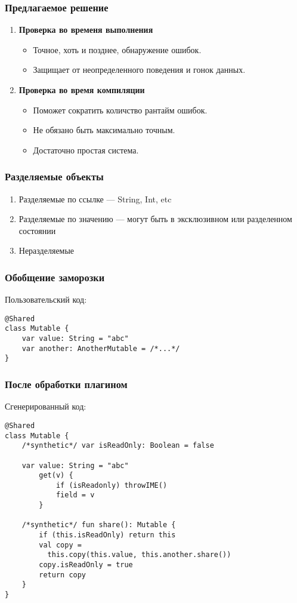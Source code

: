 \documentclass[14pt,xcolor={dvipsnames}]{beamer}
\begin{document}
\begin{frame}
\frametitle{Предлагаемое решение}
\begin{enumerate}
  \item \textbf{Проверка во временя выполнения}
  \begin{itemize}
    \item Точное, хоть и позднее, обнаружение ошибок.
    \item Защищает от неопределенного поведения и гонок данных.
  \end{itemize}
  \item \textbf{Проверка во время компиляции}
  \begin{itemize}
    \item Поможет сократить количство рантайм ошибок.
    \item Не обязано быть максимально точным.
    \item Достаточно простая система.
  \end{itemize}
\end{enumerate}
\end{frame}

\begin{frame}
\frametitle{Разделяемые объекты}
\begin{enumerate}
	\item Разделяемые по ссылке --- String, Int, etc
	\item Разделяемые по значению --- могут быть в эксклюзивном или разделенном состоянии
	\item Неразделяемые
\end{enumerate}
\end{frame}

\begin{frame}[fragile]
\frametitle{Обобщение заморозки}
Пользовательский код:
\vspace{20pt}
\begin{lstlisting}[basicstyle=\small\ttfamily]
@Shared
class Mutable {
	var value: String = "abc"
	var another: AnotherMutable = /*...*/
}
\end{lstlisting}
\end{frame}

\begin{frame}[fragile]
\frametitle{После обработки плагином}
Сгенерированный код:
\begin{lstlisting}[basicstyle=\fontsize{10}{1}\selectfont\ttfamily]
@Shared
class Mutable {
	/*synthetic*/ var isReadOnly: Boolean = false
	
	var value: String = "abc"
		get(v) {
			if (isReadonly) throwIME() 
			field = v
		}
	
	/*synthetic*/ fun share(): Mutable {
		if (this.isReadOnly) return this
		val copy = 
		  this.copy(this.value, this.another.share())
		copy.isReadOnly = true
		return copy
	}
}
\end{lstlisting}
\end{frame}
\end{document}
